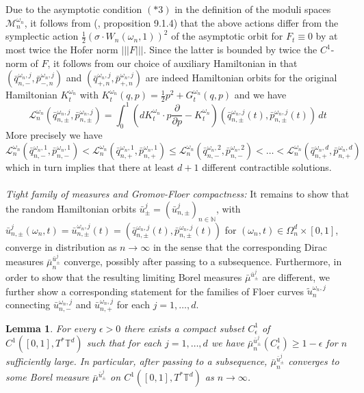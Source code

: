 \documentclass[a4paper,11pt]{amsart}
\newcommand{\NN}{\mathbb{N}}
\newcommand{\TT}{\mathbb{T}}
\newtheorem{lemma}[theorem]{Lemma}
\begin{document}
\indent Due to the asymptotic condition $(*3)$ in the definition of the moduli spaces $\mathcal{M}_n^{\omega_n}$, it follows from (\cite{MDSa}, proposition 9.1.4) that the above actions differ from the symplectic action $\frac{1}{2}(\sigma\cdot W_n(\omega_n,1))^2$ of the asymptotic orbit for $F_t\equiv 0$ by at most twice the Hofer norm $|||F|||$. Since the latter is bounded by twice the $C^1$-norm of $F$, it follows from our choice of auxiliary Hamiltonian in  that $(\bar{q}^{\omega_n,j}_{n,-},\bar{p}^{\omega_n,j}_{-,n})$ and $(\bar{q}^{\omega_n,j}_{+,n},\bar{p}^{\omega_n,j}_{+,n})$ are indeed Hamiltonian orbits for the original Hamiltonian $K_t^{\omega_n}$ with $K_t^{\omega_n}(q,p)=\frac{1}{2}p^2+G_t^{\omega_n}(q,p)$ and we have \[\mathcal{L}_n^{\omega_n}(\bar{q}^{\omega_n,j}_{n,\pm},\bar{p}^{\omega_n,j}_{n,\pm})=\int_0^1 \left( dK^{\omega_n}_t\cdot p\frac{\partial}{\partial p}-K^{\omega_n}_t\right)(\bar{q}^{\omega_n,j}_{n,\pm}(t),\bar{p}^{\omega_n,j}_{n,\pm}(t))\,dt\]
More precisely we have \[\mathcal{L}_n^{\omega_n}(\bar{q}^{\omega_n,1}_{n,-},\bar{p}^{\omega_n,1}_{n,-})<\mathcal{L}_n^{\omega_n}(\bar{q}^{\omega_n,1}_{n,+},\bar{p}^{\omega_n,1}_{n,+})\leq \mathcal{L}_n^{\omega_n}(\bar{q}^{\omega_n,2}_{n,-},\bar{p}^{\omega_n,2}_{n,-})<\ldots<\mathcal{L}_n^{\omega_n}(\bar{q}^{\omega_n,d}_{n,+},\bar{p}^{\omega_n,d}_{n,+})\] which in turn implies that there at least $d+1$ different contractible solutions.\\
\\  
\noindent\emph{Tight family of measures and Gromov-Floer compactness:} It remains to show that the random Hamiltonian orbits $\bar{u}^j_{\pm}=(\bar{u}^j_{n,\pm})_{n\in\NN}$, with $\bar{u}^j_{n,\pm}(\omega_n,t)=\bar{u}^{\omega_n,j}_{n,\pm}(t)=(\bar{q}^{\omega_n,j}_{n,\pm}(t),\bar{p}^{\omega_n,j}_{n,\pm}(t))$ for $(\omega_n,t)\in\Omega_n^d\times [0,1]$, converge in distribution as $n\to\infty$ in the sense that the corresponding Dirac measures $\bar{\mu}^{\bar{u}^j_\pm}_n$ converge, possibly after passing to a subsequence. Furthermore, in order to show that the resulting limiting Borel measures $\bar{\mu}^{\bar{u}^j_\pm}$ are different, we further show a corresponding statement for the families of Floer curves $\widetilde{u}^{\omega_n,j}_n$ connecting $\bar{u}^{\omega_n,j}_{n,-}$ and $\bar{u}^{\omega_n,j}_{n,+}$ for each $j=1,\ldots,d$.
\begin{lemma}\label{tight}
    For every $\epsilon>0$ there exists a compact subset $C^1_{\epsilon}$ of $C^1([0,1],T^*\TT^d)$ such that for each $j=1,\ldots,d$ we have $\bar{\mu}^{\bar{u}^j_\pm}_n(C^1_{\epsilon})\geq 1-\epsilon$ for $n$ sufficiently large. In particular, after passing to a subsequence, $\bar{\mu}^{\bar{u}^j_\pm}_n$ converges to some Borel measure $\bar{\mu}^{\bar{u}^j_\pm}$ on $C^1([0,1],T^*\TT^d)$ as $n\to\infty$. 
\end{lemma}
\end{document}
